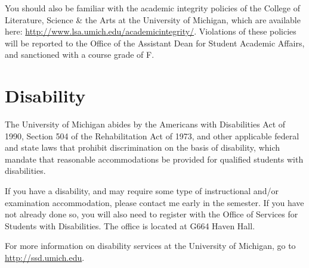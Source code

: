 \documentclass[
  letterpaper,
  DIV=11,
  numbers=noendperiod]{scrartcl}
\begin{document}
You should also be familiar with the academic integrity policies of the
College of Literature, Science \& the Arts at the University of
Michigan, which are available here:
\url{http://www.lsa.umich.edu/academicintegrity/}. Violations of these
policies will be reported to the Office of the Assistant Dean for
Student Academic Affairs, and sanctioned with a course grade of F.

\section{Disability}\label{disability}

The University of Michigan abides by the Americans with Disabilities Act
of 1990, Section 504 of the Rehabilitation Act of 1973, and other
applicable federal and state laws that prohibit discrimination on the
basis of disability, which mandate that reasonable accommodations be
provided for qualified students with disabilities.

If you have a disability, and may require some type of instructional
and/or examination accommodation, please contact me early in the
semester. If you have not already done so, you will also need to
register with the Office of Services for Students with Disabilities. The
office is located at G664 Haven Hall.

For more information on disability services at the University of
Michigan, go to \url{http://ssd.umich.edu}.
\end{document}

